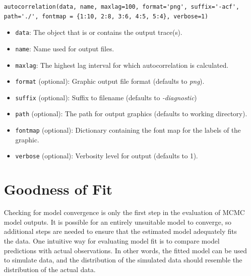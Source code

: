 \begin{verbatim}
autocorrelation(data, name, maxlag=100, format='png', suffix='-acf', path='./', fontmap = {1:10, 2:8, 3:6, 4:5, 5:4}, verbose=1)
\end{verbatim}
\begin{itemize}
	\item \verb=data=: The object that is or contains the output trace(s).

	\item \verb=name=: Name used for output files.
	
	\item \verb=maxlag=: The highest lag interval for which autocorrelation is calculated.

	\item \verb=format= (optional): Graphic output file format (defaults to \emph{png}).

	\item \verb=suffix= (optional): Suffix to filename (defaults to \emph{-diagnostic})

	\item \verb=path= (optional): The path for output graphics (defaults to working directory).

	\item \verb=fontmap= (optional): Dictionary containing the font map for the labels of the graphic.

	\item \verb=verbose= (optional): Verbosity level for output (defaults to 1).
\end{itemize}


\hypertarget{gof}{}
\section*{Goodness of Fit} %

Checking for model convergence is only the first step in the evaluation of MCMC model outputs. It is possible for an entirely unsuitable model to converge, so additional steps are needed to ensure that the estimated model adequately fits the data. One intuitive way for evaluating model fit is to compare model predictions with actual observations. In other words, the fitted model can be used to simulate data, and the distribution of the simulated data should resemble the distribution of the actual data.

